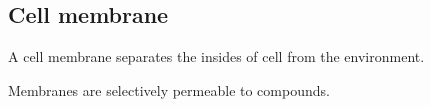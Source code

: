 
\subsection{Cell membrane}

A cell membrane separates the insides of cell from the environment.

Membranes are selectively permeable to compounds.

